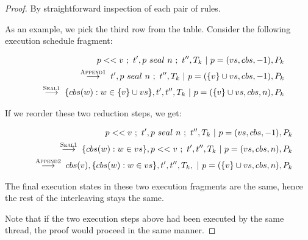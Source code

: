 \documentclass[runningheads,a4paper]{llncs}
\newcommand{\set}[1]{\{#1\}}
\begin{document}
\begin{proof}
By straightforward inspection of each pair of rules.

As an example, we pick the third row from the table. Consider the
following execution schedule fragment:

\begin{eqnarray*}
& &
p << v~;~t',p~seal~n~;~t'',T_k~|~p=(vs,cbs,-1),P_k
\\
& &
\;\stackrel{\textsc{Append1}}{\longrightarrow}\;
t',p~seal~n~;~t'',T_k~|~p=(\set{v} \cup vs,cbs,-1),P_k
\\
& &
\;\stackrel{\textsc{Seal1}}{\longrightarrow}\;
\set{cbs(w) : w \in \set{v} \cup vs},t',t'',T_k~|~p=(\set{v} \cup vs,cbs,n),P_k
\end{eqnarray*}

If we reorder these two reduction steps, we get:

\begin{eqnarray*}
& &
p << v~;~t',p~seal~n~;~t'',T_k~|~p=(vs,cbs,-1),P_k
\\
& &
\;\stackrel{\textsc{Seal1}}{\longrightarrow}\;
\set{cbs(w) : w \in vs},p << v~;~t',t'',T_k~|~p=(vs,cbs,n),P_k
\\
& &
\;\stackrel{\textsc{Append2}}{\longrightarrow}\;
cbs(v),\set{cbs(w) : w \in vs},t',t'',T_k,~|~p=(\set{v} \cup vs,cbs,n),P_k
\end{eqnarray*}

The final execution states in these two execution fragments are the
same, hence the rest of the interleaving stays the same.

Note that if the two execution steps above had been executed by
the same thread, the proof would proceed in the same manner.
\end{proof}
\end{document}
